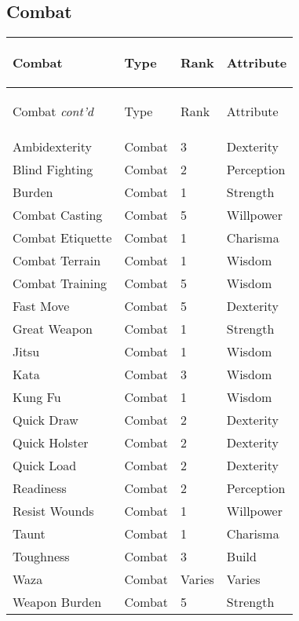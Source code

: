 \documentclass[twoside]{book}
\begin{document}
    

\subsection{Combat}
    
\begin{longtable}{p{1.25in}lll} 
  Combat& \begin{turn}{70}{Type}\end{turn}
          & \begin{turn}{70}{Rank}\end{turn}
          & \begin{turn}{70}{Attribute}\end{turn}
          \\
  \hline
  \hline
  \endfirsthead
  Combat \textit{cont'd}
        & \begin{turn}{70}{Type}\end{turn}
          & \begin{turn}{70}{Rank}\end{turn}
          & \begin{turn}{70}{Attribute}\end{turn}
           \\
  \hline
  \endhead
\raggedright  Ambidexterity& Combat& 3& Dexterity\tabularnewline
      \raggedright  Blind Fighting& Combat& 2& Perception\tabularnewline
      \raggedright  Burden& Combat& 1& Strength\tabularnewline
      \raggedright  Combat Casting& Combat& 5& Willpower\tabularnewline
      \raggedright  Combat Etiquette& Combat& 1& Charisma\tabularnewline
      \raggedright  Combat Terrain& Combat& 1& Wisdom\tabularnewline
      \raggedright  Combat Training& Combat& 5& Wisdom\tabularnewline
      \raggedright  Fast Move& Combat& 5& Dexterity\tabularnewline
      \raggedright  Great Weapon& Combat& 1& Strength\tabularnewline
      \raggedright  Jitsu& Combat& 1& Wisdom\tabularnewline
      \raggedright  Kata& Combat& 3& Wisdom\tabularnewline
      \raggedright  Kung Fu& Combat& 1& Wisdom\tabularnewline
      \raggedright  Quick Draw& Combat& 2& Dexterity\tabularnewline
      \raggedright  Quick Holster& Combat& 2& Dexterity\tabularnewline
      \raggedright  Quick Load& Combat& 2& Dexterity\tabularnewline
      \raggedright  Readiness& Combat& 2& Perception\tabularnewline
      \raggedright  Resist Wounds& Combat& 1& Willpower\tabularnewline
      \raggedright  Taunt& Combat& 1& Charisma\tabularnewline
      \raggedright  Toughness& Combat& 3& Build\tabularnewline
      \raggedright  Waza& Combat& Varies& Varies\tabularnewline
      \raggedright  Weapon Burden& Combat& 5& Strength\tabularnewline
      
\end{longtable}
    
\end{document}
